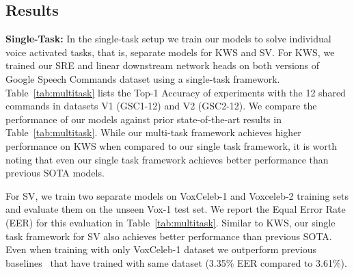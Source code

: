 \documentclass{article}
\begin{document}
\begin{table}[htp]
\centering
{}

\caption{Statistics of the datasets used in our experiments. We use the GSC datasets for KWS and VoxCeleb datasets of SV. \#K refers to the number of speakers for SV and number of keywords for the GSC dataset.
}
\label{tab:datasets}
\end{table}









\subsection{Results}
\noindent \textbf{Single-Task:}
In the single-task setup we train our models to solve individual voice activated tasks, that is, separate models for KWS and SV. 
For KWS, we trained our SRE and linear downstream network heads on both versions of Google Speech Commands dataset using a single-task framework.
Table~\ref{tab:multitask} lists the Top-1 Accuracy of experiments with the 12 shared commands in datasets V1 (GSC1-12) and V2 (GSC2-12). We compare the performance of our models against prior state-of-the-art results in Table~\ref{tab:multitask}.
While our multi-task framework achieves higher performance on KWS when compared to our single task framework, it is worth noting that even our single task framework achieves better performance than previous SOTA models. 



For SV, we train two separate models on VoxCeleb-1 and Voxceleb-2 training sets and evaluate them on the unseen Vox-1 test set. We report the Equal Error Rate (EER) for this evaluation in Table~\ref{tab:multitask}. Similar to KWS, our single task framework for SV also achieves better performance than previous SOTA. Even when training with only VoxCeleb-1 dataset we outperform previous baselines~\cite{exploringSVLID,2018attentive} that have trained with same dataset (3.35\% EER compared to 3.61\%). 
\end{document}
